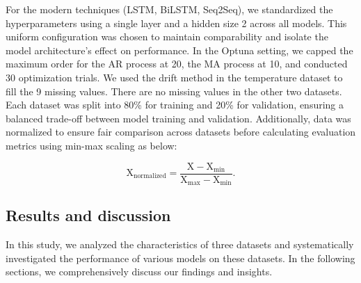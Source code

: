 \documentclass[sn-mathphys-num]{sn-jnl}
\theoremstyle{thmstyleone}%
\theoremstyle{thmstyletwo}%
\theoremstyle{thmstylethree}%
\begin{document}
For the modern techniques (LSTM, BiLSTM, Seq2Seq), we standardized the hyperparameters using a single layer and a hidden size 2 across all models. This uniform configuration was chosen to maintain comparability and isolate the model architecture's effect on performance. In the Optuna setting, we capped the maximum order for the AR process at 20, the MA process at 10, and conducted 30 optimization trials. 
We used the drift method in the temperature dataset to fill the 9 missing values. There are no missing values in the other two datasets. Each dataset was split into 80\% for training and 20\% for validation, ensuring a balanced trade-off between model training and validation. Additionally, data was normalized to ensure fair comparison across datasets before calculating evaluation metrics using min-max scaling as below:

\begin{equation}
\text{X}_{\text{normalized}} = \frac{\text{X} - \text{X}_{\min}}{\text{X}_{\max} - \text{X}_{\min}}.
\label{nomalize}
\end{equation}

\subsection{Results and discussion}
In this study, we analyzed the characteristics of three datasets and systematically investigated the performance of various models on these datasets. In the following sections, we comprehensively discuss our findings and insights.
\end{document}
